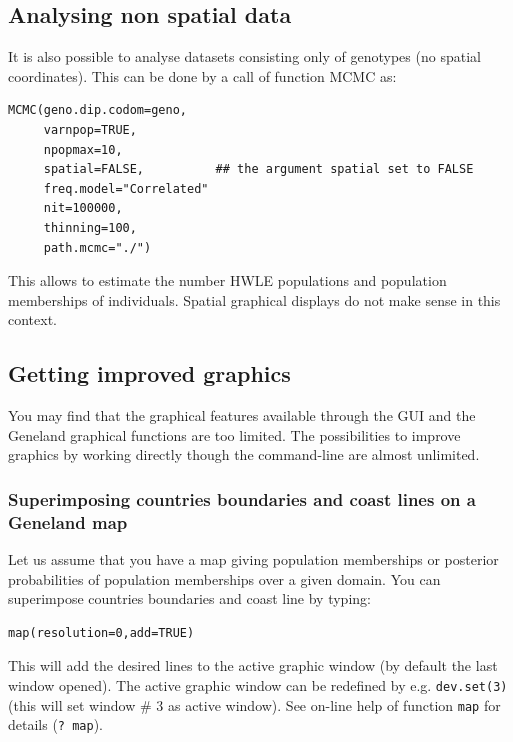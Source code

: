 \documentclass[a4paper,10pt]{article}
\begin{document}
\subsection{Analysing non spatial data}

It is also possible to analyse datasets consisting only of genotypes (no spatial coordinates). 
This can be done by  a call of function MCMC as:


\begin{verbatim}
MCMC(geno.dip.codom=geno, 
     varnpop=TRUE, 
     npopmax=10,
     spatial=FALSE,          ## the argument spatial set to FALSE
     freq.model="Correlated"
     nit=100000,
     thinning=100,
     path.mcmc="./")
\end{verbatim}



This allows to estimate the number HWLE populations and population memberships of individuals. 
Spatial graphical displays do not make sense in this context. 

\subsection{Getting improved graphics}
You may find that the graphical features available through the GUI and the {\sc Geneland} graphical functions are too limited. 
The possibilities to improve graphics by working directly though the command-line  are almost unlimited.

\subsubsection{Superimposing countries boundaries and coast lines on a {\sc Geneland} map}

Let us assume that you have a map giving population memberships or posterior probabilities of population memberships over a given domain. 
You can superimpose countries boundaries and coast line by typing:

\begin{verbatim}
map(resolution=0,add=TRUE)
\end{verbatim}

 


This will add the desired lines to the active graphic window (by default the last window opened). 
The active graphic window can be redefined by e.g. \texttt{dev.set(3)} (this will set window \# 3 as active window). 
See on-line help of function \texttt{map} for details (\texttt{? map}).
\end{document}
